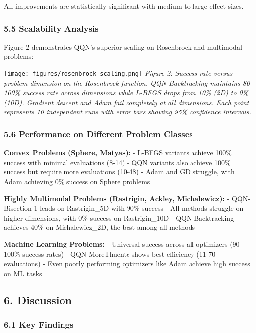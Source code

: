 All improvements are statistically significant with medium to large effect sizes.

\hypertarget{scalability-analysis}{%
\subsubsection{5.5 Scalability Analysis}\label{scalability-analysis}}

Figure 2 demonstrates QQN's superior scaling on Rosenbrock and multimodal problems:

\texttt{[image: figures/rosenbrock\_scaling.png]}
\emph{Figure 2: Success rate versus problem dimension on the Rosenbrock function. QQN-Backtracking maintains 80-100\% success rate across dimensions while L-BFGS drops from 10\% (2D) to 0\% (10D). Gradient descent and Adam fail completely at all dimensions. Each point represents 10 independent runs with error bars showing 95\% confidence intervals.}

\hypertarget{performance-on-different-problem-classes}{%
\subsubsection{5.6 Performance on Different Problem Classes}\label{performance-on-different-problem-classes}}

\textbf{Convex Problems (Sphere, Matyas):}
- L-BFGS variants achieve 100\% success with minimal evaluations (8-14)
- QQN variants also achieve 100\% success but require more evaluations (10-48)
- Adam and GD struggle, with Adam achieving 0\% success on Sphere problems

\textbf{Highly Multimodal Problems (Rastrigin, Ackley, Michalewicz):}
- QQN-Bisection-1 leads on Rastrigin\_5D with 90\% success
- All methods struggle on higher dimensions, with 0\% success on Rastrigin\_10D
- QQN-Backtracking achieves 40\% on Michalewicz\_2D, the best among all methods

\textbf{Machine Learning Problems:}
- Universal success across all optimizers (90-100\% success rates)
- QQN-MoreThuente shows best efficiency (11-70 evaluations)
- Even poorly performing optimizers like Adam achieve high success on ML tasks

\hypertarget{discussion}{%
\subsection{6. Discussion}\label{discussion}}

\hypertarget{key-findings}{%
\subsubsection{6.1 Key Findings}\label{key-findings}}

